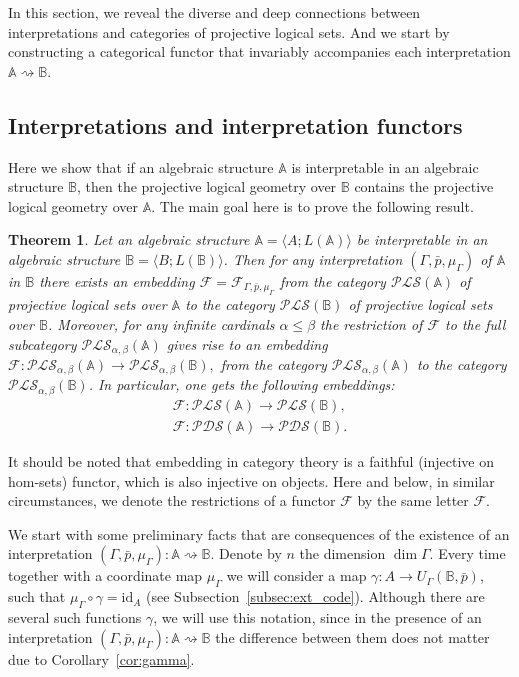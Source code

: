 \documentclass[12pt]{article}
\newtheorem{theorem}{Theorem}
\theoremstyle{definition}
\def\MA{{\mathbb{A}}}
\def\MB{{\mathbb{B}}}
\def\F{{\mathcal{F}}}
\def\PLS{{\mathcal{PLS}}}
\def\PDS{{\mathcal{PDS}}}
\def\id{{\mathrm{id}}}
\begin{document}
In this section, we reveal the diverse and deep connections between interpretations and categories of projective logical sets. And we start by constructing a categorical functor that invariably accompanies each interpretation  $\MA\rightsquigarrow\MB$.

\subsection{Interpretations and interpretation functors}\label{subsec:int_func}

Here we show that if an algebraic structure $\MA$ is interpretable in an algebraic structure $\MB$, then the projective logical geometry over $\MB$ contains the projective logical geometry over $\MA$. The main goal here is to prove the following result.

\begin{theorem}\label{th:inter}
Let an algebraic structure $\MA=\langle A; L(\MA)\rangle$ be interpretable in an algebraic structure $\MB=\langle B; L(\MB)\rangle$. Then for any interpretation $(\Gamma,\bar p,\mu_\Gamma)$ of $\MA$ in $\MB$ there exists an embedding  $\F=\F_{\Gamma,\bar p,\mu_\Gamma}$ from the category $\PLS(\MA)$ of projective logical sets over $\MA$ to the category $\PLS(\MB)$ of projective logical sets over $\MB$. Moreover, for any infinite cardinals $\alpha\leqslant\beta$ the restriction of $\F$ to the full subcategory $\PLS_{\alpha,\beta}(\MA)$ gives rise to an embedding $\F\colon\PLS_{\alpha,\beta}(\MA)\to\PLS_{\alpha,\beta}(\MB),$ from the category $\PLS_{\alpha,\beta}(\MA)$ to the category $\PLS_{\alpha,\beta}(\MB)$. In particular, one gets the following embeddings:
\begin{gather*}
\F\colon\PLS(\MA)\to\PLS(\MB),\\
\F\colon\PDS(\MA)\to\PDS(\MB).
\end{gather*}
\end{theorem}

It should be noted that embedding in category theory is a faithful (injective on hom-sets) functor, which is also injective on objects.
Here and below, in similar circumstances, we denote the restrictions of a functor $\F$ by the same letter $\F$.

We start with some preliminary facts that are consequences of the existence of an interpretation $(\Gamma,\bar p,\mu_\Gamma)\colon\MA\rightsquigarrow\MB$. Denote by $n$ the dimension $\dim \Gamma$. Every time together with a coordinate map $\mu_\Gamma$ we will consider a map $\gamma\colon A\to U_\Gamma(\MB,\bar p)$, such that $\mu_\Gamma\circ\gamma=\id_A$ (see Subsection~\ref{subsec:ext_code}). Although there are several such functions $\gamma$, we will use this notation, since in the presence of an interpretation $(\Gamma,\bar p,\mu_\Gamma)\colon\MA\rightsquigarrow\MB$ the difference between them does not matter due to Corollary~\ref{cor:gamma}. 
\end{document}
